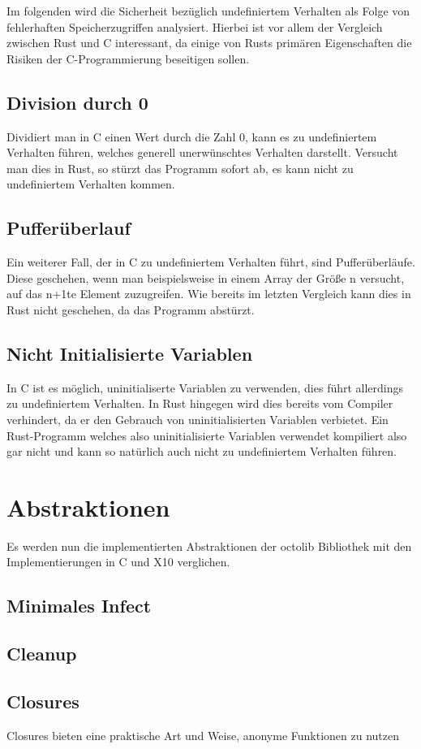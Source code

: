 Im folgenden wird die Sicherheit bezüglich undefiniertem Verhalten als Folge von fehlerhaften Speicherzugriffen analysiert.
Hierbei ist vor allem der Vergleich zwischen Rust und C interessant, da einige von Rusts primären Eigenschaften die
Risiken der C-Programmierung beseitigen sollen.

\subsection{Division durch 0}

Dividiert man in C einen Wert durch die Zahl 0, kann es zu undefiniertem Verhalten führen, welches generell
unerwünschtes Verhalten darstellt. Versucht man dies in Rust, so stürzt das Programm sofort ab, es kann nicht zu undefiniertem
Verhalten kommen.

\subsection{Pufferüberlauf}

Ein weiterer Fall, der in C zu undefiniertem Verhalten führt, sind Pufferüberläufe. Diese geschehen, wenn man beispielsweise
in einem Array der Größe n versucht, auf das n+1te Element zuzugreifen. Wie bereits im letzten Vergleich kann dies in 
Rust nicht geschehen, da das Programm abstürzt.

\subsection{Nicht Initialisierte Variablen}

In C ist es möglich, uninitialiserte Variablen zu verwenden, dies führt allerdings zu undefiniertem Verhalten. In Rust hingegen
wird dies bereits vom Compiler verhindert, da er den Gebrauch von uninitialisierten Variablen verbietet. Ein Rust-Programm
welches also uninitialisierte Variablen verwendet kompiliert also gar nicht und kann so natürlich auch nicht
zu undefiniertem Verhalten führen.


\section{Abstraktionen}

Es werden nun die implementierten Abstraktionen der octolib Bibliothek mit den Implementierungen in C und X10 verglichen.

\subsection{Minimales Infect}

\subsection{Cleanup}

\subsection{Closures}

Closures bieten eine praktische Art und Weise, anonyme Funktionen zu nutzen


